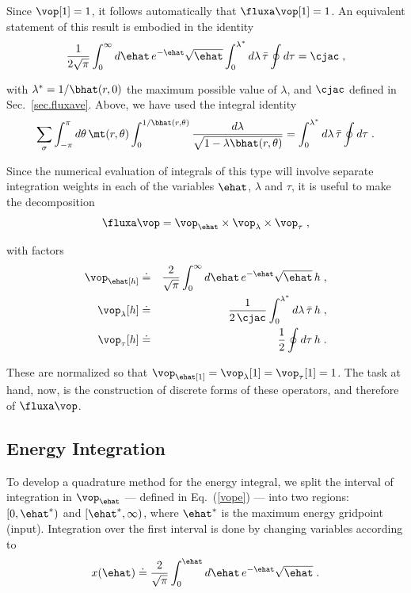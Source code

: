 Since $\vop[1] = 1$, it follows automatically that 
$\fluxa\vop[1] = 1$.  An equivalent statement of 
this result is embodied in the identity
%
\begin{equation}
\frac{1}{2\sqrt{\pi}}
\int_0^\infty  d\ehat \, e^{-\ehat} \sqrt{\ehat} 
\int_0^{\lambda^*} d\lambda \, \bar{\tau} 
\oint d\tau = \cjac \; ,
\end{equation}

\noindent
with $\lambda^* = 1/\bhat(r,0)$ the maximum possible 
value of $\lambda$, and $\cjac$ defined in Sec.~\ref{sec.fluxave}.
Above, we have used the integral identity
%
\begin{equation}
\sum_\sigma \int_{-\pi}^\pi d\theta \, \mt(r,\theta)
\int_0^{1/\bhat(r,\theta)} 
\frac{d\lambda}{\sqrt{1-\lambda\bhat(r,\theta)}} 
= \int_0^{\lambda^*} d\lambda \, \bar{\tau} \oint d\tau \; .
\end{equation}

\noindent
Since the numerical evaluation of integrals of this
type will involve separate integration weights in 
each of the variables $\ehat$, $\lambda$ and $\tau$, 
it is useful to make the decomposition 
%
\begin{equation}
\fluxa\vop = \vop_\ehat \times \vop_\lambda \times \vop_\tau \; ,
\end{equation}

\noindent
with factors
%
\begin{eqnarray}
\vop_\ehat[h] & \doteq & \frac{2}{\sqrt{\pi}}
\int_0^\infty  d\ehat \, e^{-\ehat} \sqrt{\ehat} \, h \; , 
\label{vope} \\
\vop_\lambda[h] & \doteq & \frac{1}{2\,\cjac} 
\int_0^{\lambda^*} d\lambda \, \bar{\tau}  \, h \; , \\
\label{vopl}
\vop_\tau[h] & \doteq & \frac{1}{2} \oint d\tau \, h \; .
\label{vopt}
\end{eqnarray}

\noindent
These are normalized so that 
$\vop_\ehat[1] = \vop_\lambda[1] = \vop_\tau[1] = 1$.
The task at hand, now, is the construction of discrete forms 
of these operators, and therefore of $\fluxa\vop$.

\subsection{Energy Integration}

To develop a quadrature method for the energy 
integral, we split the interval of integration in 
$\vop_\ehat$ --- defined in Eq.~(\ref{vope}) --- into 
two regions:  $[0,\ehat^*)$ and $[\ehat^*,\infty)$, 
where $\ehat^*$ is the maximum energy gridpoint (input).  
Integration over the first interval is done by changing 
variables according to
%
\begin{equation}
x(\ehat) \doteq \frac{2}{\sqrt{\pi}} \int_0^\ehat 
d\ehat \, e^{-\ehat} \sqrt{\ehat} \; .
\end{equation}

